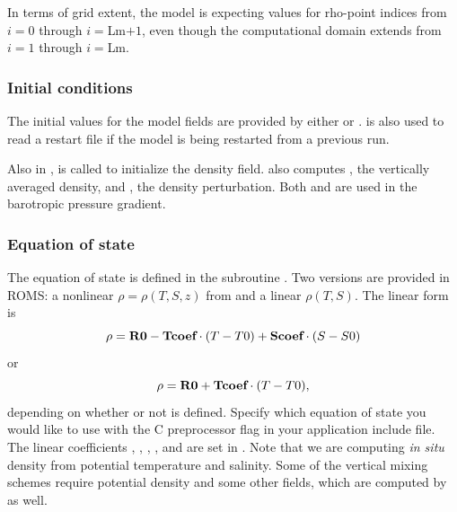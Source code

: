 In terms of grid extent, the model is expecting values for rho-point indices
from $i = 0$ through $i = $Lm$ + 1$, even though the computational
domain extends from $i = 1$ through $i = $Lm.

\subsubsection{Initial conditions}
The initial values for the model fields are provided by either
 or .   is
also used to read a restart file if the model is being restarted from a
previous run.

Also in ,  is called to initialize
the density field.  also computes ,
the vertically averaged density, and , the density
perturbation. Both  and  are used in the barotropic
pressure gradient.


\subsubsection{Equation of state}
The equation of state is defined in the subroutine .  Two
versions are provided in ROMS: a nonlinear $\rho =
\rho(T,S,z)$ from \citet{Jackett} and a linear
$\rho(T,S)$.  The linear form is
$$
      \rho = \mbox{\bf R0} - \mbox{\bf Tcoef} \cdot (T-T0) +
      \mbox{\bf Scoef} \cdot (S-S0)
$$
or
$$
     \rho = \mbox{\bf R0} + \mbox{\bf Tcoef} \cdot (T-T0),
$$
depending on whether or not
 is defined.  Specify which equation of state you
would like to use with the  C preprocessor flag in your
application include file. The linear coefficients , ,
, , and  are set in . Note
that we are computing {\em in situ} density from potential temperature and
salinity. Some of the vertical mixing schemes require potential density
and some other fields, which are computed by  as well.

